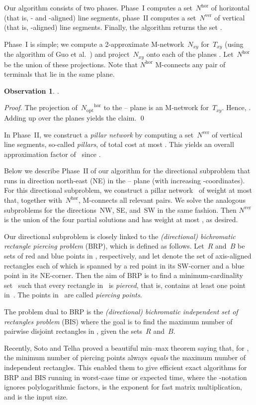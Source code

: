 \documentclass[11pt]{llncs}
\newcommand{\Nopt}{\ensuremath{N_\mathrm{opt}}\xspace}
\newcommand{\Nhor}{\ensuremath{N^\mathrm{hor}}\xspace}
\newcommand{\Nver}{\ensuremath{N^\mathrm{ver}}\xspace}
\newcommand{\Nopthor}{\ensuremath{\Nopt^\mathrm{hor}}\xspace}
\newcommand{\Nxy}{\ensuremath{N_{xy}}\xspace}
\newcommand{\Txy}{\ensuremath{T_{xy}}\xspace}
\newcommand{\red}{\ensuremath{R}\xspace}
\newcommand{\blue}{\ensuremath{B}\xspace}
\newcommand{\BRP}{\ensuremath{\mathrm{BRP}}\xspace}
\newcommand{\etal}{et al.}
\newtheorem{observation}{Observation}
\newenvironment{pf}{\begin{proof}}{\qed\end{proof}}
\begin{document}
Our algorithm consists of two phases.  Phase~I computes a set~\Nhor of
horizontal (that is, - and -aligned) line segments, phase~II
computes a set~\Nver of vertical (that is, -aligned) line segments.
Finally, the algorithm returns the set . 

Phase~I is simple; we compute a 2-approximate M-network~\Nxy for~\Txy
(using the algorithm of Guo \etal~\cite{gsz-yaa2a-08}) and
project~\Nxy onto each of the planes .  Let~\Nhor be the union of
these projections.  Note that \Nhor M-connects any pair of terminals
that lie in the same plane.
\begin{observation}
  \label{obs:Nhor}
  .
\end{observation}
\begin{pf}
  The projection of~\Nopthor to the -- plane is an M-network
  for~\Txy.  Hence, .  Adding up over the 
  planes yields the claim.
\end{pf}
In Phase~II, we construct a {\em pillar network} by computing a set~\Nver of
vertical line segments, so-called \emph{pillars}, of total cost at
most .  This yields an overall approximation
factor of~ since .

Below we describe Phase~II of our algorithm 
for the directional subproblem 
that runs in direction north-east (NE) in the --
plane (with increasing -coordinates). For this directional subproblem, we
construct a pillar
network~ of weight at most  that, together
with~\Nhor, M-connects all relevant pairs.   
We solve the analogous
subproblems for the directions~NW, SE, and~SW in the same fashion.
Then \Nver is the union of the four partial solutions and has weight
at most , as desired.


Our directional subproblem is closely linked to the
\emph{(directional) bichromatic rectangle piercing problem} (\BRP),
which is defined as follows.  Let~\red and~\blue be sets of red and
blue points in , respectively, and let 
denote the set of axis-aligned rectangles each of which is spanned by
a red point in its SW-corner and a blue point in its NE-corner.  Then
the aim of \BRP is to find a minimum-cardinality set~
such that every rectangle in~ is \emph{pierced},
that is, contains at least one point in~.  The points in~ are
called \emph{piercing points}. 

The problem dual to BRP is the \emph{(directional) bichromatic
  independent set of rectangles problem} (BIS) where the goal is to
find the maximum number of pairwise disjoint rectangles in , given the sets~\red and~\blue.

Recently, Soto and Telha \cite{st-2dorg-11} proved a beautiful
min--max theorem saying that, for , the
minimum number of piercing points always \emph{equals} the maximum
number of independent rectangles.  This enabled them to give efficient
exact algorithms for \BRP and BIS running in 
worst-case time or  expected time, where the
-notation ignores polylogarithmic factors,  is the exponent for fast matrix multiplication, and
 is the input size.
\end{document}
